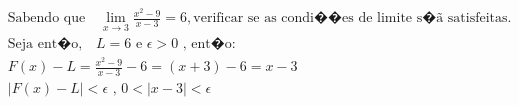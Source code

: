 \begin{ex}
\begin{align}
&\text{Sabendo que} \quad \lim_{x\rightarrow 3} \frac{x^2-9}{x-3}=6,\text{verificar se as condi��es de limite s�ã satisfeitas.}\nonumber\\
&\text{Seja ent�o,}\quad L = 6\text{ e }\epsilon>0\text{ , ent�o:}\nonumber\\
&F(x) - L = \frac{x^2-9}{x-3}-6 = (x+3)-6 = x - 3\nonumber\\ 
&\left|F(x)- L\right| < \epsilon \text{ , } 0 < \left|x - 3 \right| < \epsilon\nonumber
\end{align}
\end{ex}
